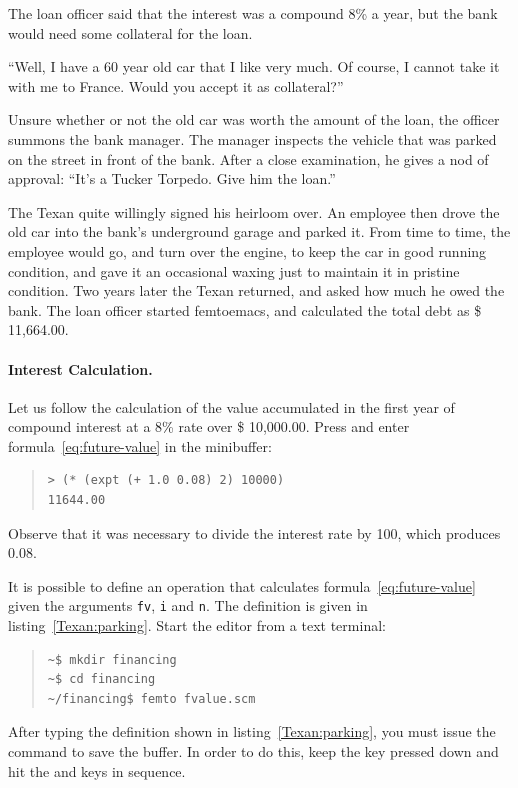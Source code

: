 \documentclass[a4paper,12pt]{book}
\begin{document}
The loan officer said that the interest was a compound 8\%
a year, but the bank would need some collateral for the loan.

“Well, I have a 60 year old car that I like very much.
Of course, I cannot take it with me to France.
Would you accept it as collateral?”

Unsure whether or not the old car was worth the
amount of the loan, the officer summons the bank manager.
The manager inspects the vehicle that was parked on the
street in front of the bank. After a close examination,
he gives a nod of approval: “It’s a Tucker Torpedo.
Give him the loan.”

The Texan quite willingly signed his heirloom over.
An employee then drove the old car into the bank’s
underground garage and parked it. From time to time,
the employee would go, and turn over the engine, to keep
the car in good running condition, and gave it an
occasional waxing just to maintain it in pristine condition.
Two years later the Texan returned, and asked how
much he owed the bank. The loan officer started femtoemacs,
and calculated the total debt as \$ 11,664.00.

\paragraph{Interest Calculation.}
Let us follow the calculation of the value accumulated
in the first year of compound interest at a 8\% rate
over \$ 10,000.00. Press  and
enter formula~\ref{eq:future-value} in the minibuffer:
\begin{quote}
\begin{verbatim}
> (* (expt (+ 1.0 0.08) 2) 10000)
11644.00
\end{verbatim}
\end{quote}
Observe that it was necessary to divide the
interest rate by 100, which produces 0.08.

It is possible to define an operation that
calculates formula~\ref{eq:future-value}
given the arguments \verb|fv|, \verb|i|
and \verb|n|. The definition is given
in listing~\ref{Texan:parking}.
Start the editor from a text terminal:
\begin{quote}
\begin{verbatim}
~$ mkdir financing
~$ cd financing
~/financing$ femto fvalue.scm
\end{verbatim}
\end{quote}
After typing the definition shown
in listing~\ref{Texan:parking},
you must issue the 
command to save the buffer.
In order to do this, keep the
 key pressed down and
hit the  and
 keys in sequence.
\end{document}
